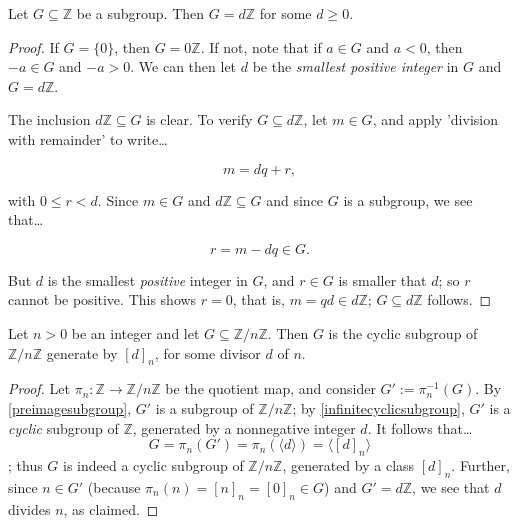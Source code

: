 \begin{proposition}
\label{infinitecyclicsubgroup}
Let $G \subseteq \mathbb{Z}$ be a subgroup. Then $G = d\mathbb{Z}$ for some $d \geq 0$.
\end{proposition}

\begin{proof}
If $G = \{ 0 \}$, then $G = 0\mathbb{Z}$. If not, note that if $a \in G$ and $a < 0$, then $-a \in G$ and $-a > 0$.
We can then let $d$ be the \emph{smallest positive integer} in $G$ and $G = d\mathbb{Z}$.

The inclusion $d\mathbb{Z} \subseteq G$ is clear. To verify $G \subseteq d\mathbb{Z}$, let $m \in G$, and apply 'division with remainder'
to write\dots

$$m = dq + r,$$

with $0 \leq r < d$. Since $m \in G$ and $d\mathbb{Z} \subseteq G$ and since $G$ is a subgroup, we see that\dots

$$r = m - dq \in G.$$

But $d$ is the smallest \emph{positive} integer in $G$, and $r \in G$ is smaller that $d$; so $r$ cannot be positive. This shows $r = 0$, that is,
$m = qd \in d\mathbb{Z}$; $G \subseteq d\mathbb{Z}$ follows.
\end{proof}

\begin{proposition}
Let $n > 0$ be an integer and let $G \subseteq \mathbb{Z}/n\mathbb{Z}$. Then $G$ is the cyclic subgroup of $\mathbb{Z}/n\mathbb{Z}$ generate by $[d]_n$,
for some divisor $d$ of $n$.
\end{proposition}

\begin{proof}
Let $\pi_n : \mathbb{Z} \rightarrow \mathbb{Z}/n\mathbb{Z}$ be the quotient map, and consider $G' := \pi_n^{-1}(G).$
By \ref{preimagesubgroup}, $G'$ is a subgroup of $\mathbb{Z}/n\mathbb{Z}$; by \ref{infinitecyclicsubgroup}, $G'$ is a
\emph{cyclic} subgroup of $\mathbb{Z}$, generated by a nonnegative integer $d$. It follows that\dots
$$G = \pi_n(G') = \pi_n(\langle d \rangle) = \langle [d]_n \rangle$$;
thus $G$ is indeed a cyclic subgroup of $\mathbb{Z}/n\mathbb{Z}$, generated by a class $[d]_n$. Further, since
$n \in G'$ (because $\pi_n(n) = [n]_n = [0]_n \in G$) and $G' = d\mathbb{Z}$, we see that $d$ divides $n$, as
claimed.
\end{proof}
